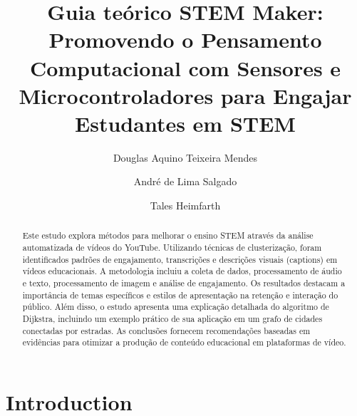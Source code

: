 \documentclass[manuscript,screen,review]{acmart}
\begin{document}
\title{Guia teórico STEM Maker: Promovendo o Pensamento Computacional com Sensores e Microcontroladores para Engajar Estudantes em STEM}
\author{Douglas Aquino Teixeira Mendes}
\authornote{}

\author{André de Lima Salgado}

\author{Tales Heimfarth}

\begin{abstract}
    Este estudo explora métodos para melhorar o ensino STEM através da análise automatizada de vídeos do YouTube. Utilizando técnicas de clusterização, foram identificados padrões de engajamento, transcrições e descrições visuais (captions) em vídeos educacionais. A metodologia incluiu a coleta de dados, processamento de áudio e texto, processamento de imagem e análise de engajamento. Os resultados destacam a importância de temas específicos e estilos de apresentação na retenção e interação do público. Além disso, o estudo apresenta uma explicação detalhada do algoritmo de Dijkstra, incluindo um exemplo prático de sua aplicação em um grafo de cidades conectadas por estradas. As conclusões fornecem recomendações baseadas em evidências para otimizar a produção de conteúdo educacional em plataformas de vídeo.

\end{abstract}


\maketitle

\newpage 
\section{Introduction}
\end{document}
